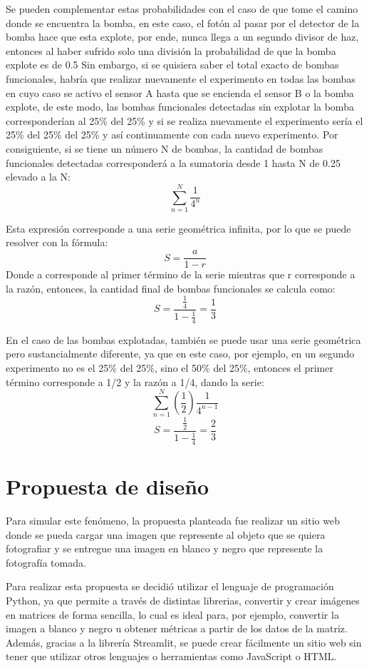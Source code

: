 \documentclass[conference]{IEEEtran}
\begin{document}
Se pueden complementar estas probabilidades con el caso de que tome el camino donde se encuentra la bomba, en este caso, el fotón al pasar por el detector de la bomba hace que esta explote, 
por ende, nunca llega a un segundo divisor de haz, entonces al haber sufrido solo una división la probabilidad de que la bomba explote es de 0.5
Sin embargo, si se quisiera saber el total exacto de bombas funcionales, habría que realizar nuevamente el experimento en todas las bombas en cuyo caso se activo el sensor A hasta que se encienda
el sensor B o la bomba explote, de este modo, las bombas funcionales detectadas sin explotar la bomba corresponderían al 25\% del 25\% y si se realiza nuevamente el experimento sería el 
25\% del 25\% del 25\% y así continuamente con cada nuevo experimento. Por consiguiente, si se tiene un número N de bombas, la cantidad de bombas funcionales detectadas corresponderá a la sumatoria desde 1 hasta N
de 0.25 elevado a la N:
\[
\sum_{n=1}^{N} \frac{1}{4^n}
\]

Esta expresión corresponde a una serie geométrica infinita, por lo que se puede resolver con la fórmula:
\[
S = \frac{a}{1-r}
\]
Donde a corresponde al primer término de la serie mientras que r corresponde a la razón, entonces, la cantidad final de bombas funcionales se calcula como:
\[
S=\frac{\frac{1}{4}}{1-\frac{1}{4}}=\frac{1}{3}
\]

En el caso de las bombas explotadas, también se puede usar una serie geométrica pero sustancialmente diferente, ya que en este caso, por ejemplo, en un segundo experimento
no es el 25\% del 25\%, sino el 50\% del 25\%, entonces el primer término corresponde a 1/2 y la razón a 1/4, dando la serie:
\[
\sum_{n=1}^{N} (\frac{1}{2})\frac{1}{4^{n-1}}
\]
\[
S=\frac{\frac{1}{2}}{1-\frac{1}{4}}=\frac{2}{3}
\]


\section{Propuesta de diseño}
Para simular este fenómeno, la propuesta planteada fue realizar un sitio web donde se pueda cargar una imagen que represente al objeto
que se quiera fotografiar y se entregue una imagen en blanco y negro que represente la fotografía tomada.

Para realizar esta propuesta se decidió utilizar el lenguaje de programación Python, ya que permite a través de distintas librerias,
convertir y crear imágenes en matrices de forma sencilla, lo cual es ideal para, por ejemplo, convertir la imagen a blanco y negro u
obtener métricas a partir de los datos de la matriz. Además, gracias a la librería Streamlit, se puede crear fácilmente un sitio web sin tener 
que utilizar otros lenguajes o herramientas como JavaScript o HTML.
\end{document}
